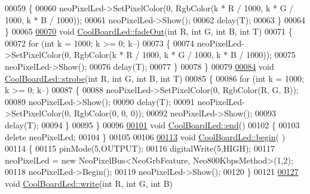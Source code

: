 \begin{DoxyCode}
00059     \{
00060         neoPixelLed->SetPixelColor(0, RgbColor(k * R / 1000, k * G / 1000, k * B / 1000));
00061         neoPixelLed->Show();
00062         delay(T);
00063     \}
00064 \}
00065 
\hyperlink{class_cool_board_led_a27c4e14fa2cd3639c0844152cea98887}{00070} \textcolor{keywordtype}{void} \hyperlink{class_cool_board_led_a27c4e14fa2cd3639c0844152cea98887}{CoolBoardLed::fadeOut}(\textcolor{keywordtype}{int} R, \textcolor{keywordtype}{int} G, \textcolor{keywordtype}{int} B, \textcolor{keywordtype}{int} T) 
00071 \{
00072     \textcolor{keywordflow}{for} (\textcolor{keywordtype}{int} k = 1000; k >= 0; k--) 
00073     \{
00074         neoPixelLed->SetPixelColor(0, RgbColor(k * R / 1000, k * G / 1000, k * B / 1000));
00075         neoPixelLed->Show();
00076         delay(T);
00077     \}
00078 \}
00079 
\hyperlink{class_cool_board_led_adc08c0ac07473499971c503d300f0413}{00084} \textcolor{keywordtype}{void} \hyperlink{class_cool_board_led_adc08c0ac07473499971c503d300f0413}{CoolBoardLed::strobe}(\textcolor{keywordtype}{int} R, \textcolor{keywordtype}{int} G, \textcolor{keywordtype}{int} B, \textcolor{keywordtype}{int} T) 
00085 \{
00086     \textcolor{keywordflow}{for} (\textcolor{keywordtype}{int} k = 1000; k >= 0; k--) 
00087     \{
00088         neoPixelLed->SetPixelColor(0, RgbColor(R, G, B));
00089         neoPixelLed->Show();
00090         delay(T);
00091         neoPixelLed->SetPixelColor(0, RgbColor(0, 0, 0));
00092         neoPixelLed->Show();
00093         delay(T);
00094     \}
00095 \}
00096 
\hyperlink{class_cool_board_led_a69f323359e0c9f797422f2152b5d41ef}{00101} \textcolor{keywordtype}{void} \hyperlink{class_cool_board_led_a69f323359e0c9f797422f2152b5d41ef}{CoolBoardLed::end}()
00102 \{
00103     \textcolor{keyword}{delete} neoPixelLed;
00104 \}
00105 
00106 
\hyperlink{class_cool_board_led_ae3cbde8affcc6f011cbd698c8ef911f6}{00113} \textcolor{keywordtype}{void} \hyperlink{class_cool_board_led_ae3cbde8affcc6f011cbd698c8ef911f6}{CoolBoardLed::begin}( )
00114 \{
00115     pinMode(5,OUTPUT);
00116     digitalWrite(5,HIGH);
00117     neoPixelLed = \textcolor{keyword}{new} NeoPixelBus<NeoGrbFeature, Neo800KbpsMethod>(1,2); 
00118     neoPixelLed->Begin();
00119     neoPixelLed->Show();
00120 \} 
00121 
\hyperlink{class_cool_board_led_a30fadd4cbec17ceea428bf7a32207e87}{00127} \textcolor{keywordtype}{void} \hyperlink{class_cool_board_led_a30fadd4cbec17ceea428bf7a32207e87}{CoolBoardLed::write}(\textcolor{keywordtype}{int} R, \textcolor{keywordtype}{int} G, \textcolor{keywordtype}{int} B)

\end{DoxyCode}
